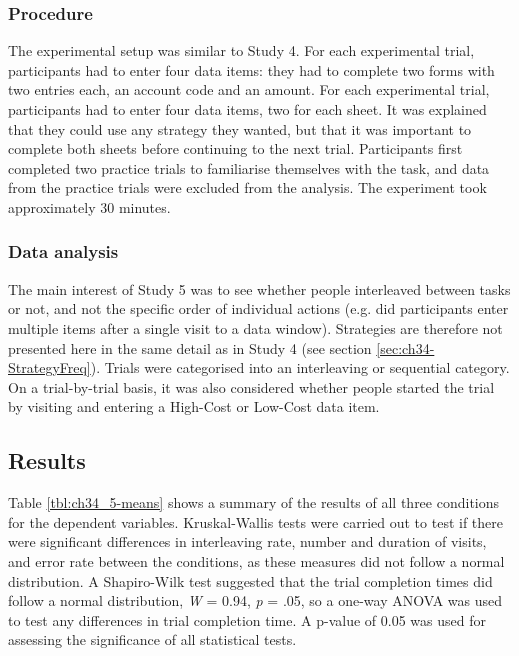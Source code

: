 
\subsubsection{Procedure}
The experimental setup was similar to Study 4. For each experimental trial, participants had to enter four data items: they had to complete two forms with two entries each, an account code and an amount. For each experimental trial, participants had to enter four data items, two for each sheet. It was explained that they could use any strategy they wanted, but that it was important to complete both sheets before continuing to the next trial. Participants first completed two practice trials to familiarise themselves with the task, and data from the practice trials were excluded from the analysis. The experiment took approximately 30 minutes.

\subsubsection{Data analysis}
The main interest of Study 5 was to see whether people interleaved between tasks or not, and not the specific order of individual actions (e.g. did participants enter multiple items after a single visit to a data window). Strategies are therefore not presented here in the same detail as in Study 4 (see section \ref{sec:ch34-StrategyFreq}). Trials were categorised into an interleaving or sequential category. On a trial-by-trial basis, it was also considered whether people started the trial by visiting and entering a High-Cost or Low-Cost data item.

\subsection{Results}
Table \ref{tbl:ch34_5-means} shows a summary of the results of all three conditions for the dependent variables. Kruskal-Wallis tests were carried out to test if there were significant differences in interleaving rate, number and duration of visits, and error rate between the conditions, as these measures did not follow a normal distribution. 
A Shapiro-Wilk test suggested that the trial completion times did follow a normal distribution, \textit{W} = 0.94, \textit{p} = .05, so a one-way ANOVA was used to test any differences in trial completion time. A p-value of 0.05 was used for assessing the significance of all statistical tests. 

